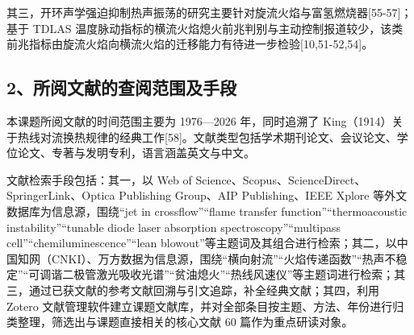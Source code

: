\documentclass[UTF8,a4paper,zihao=-4,fontset=windows]{ctexart}
\begin{document}
其三，开环声学强迫抑制热声振荡的研究主要针对旋流火焰与富氢燃烧器[55-57]；基于 TDLAS 温度脉动指标的横流火焰熄火前兆判别与主动控制报道较少，该类前兆指标由旋流火焰向横流火焰的迁移能力有待进一步检验[10,51-52,54]。

\subsection{2、所阅文献的查阅范围及手段}
本课题所阅文献的时间范围主要为 1976—2026 年，同时追溯了 King（1914）关于热线对流换热规律的经典工作[58]。文献类型包括学术期刊论文、会议论文、学位论文、专著与发明专利，语言涵盖英文与中文。

文献检索手段包括：其一，以 Web of Science、Scopus、ScienceDirect、SpringerLink、Optica Publishing Group、AIP Publishing、IEEE Xplore 等外文数据库为信息源，围绕“jet in crossflow”“flame transfer function”“thermoacoustic instability”“tunable diode laser absorption spectroscopy”“multipass cell”“chemiluminescence”“lean blowout”等主题词及其组合进行检索；其二，以中国知网（CNKI）、万方数据为信息源，围绕“横向射流”“火焰传递函数”“热声不稳定”“可调谐二极管激光吸收光谱”“贫油熄火”“热线风速仪”等主题词进行检索；其三，通过已获文献的参考文献回溯与引文追踪，补全经典文献；其四，利用 Zotero 文献管理软件建立课题文献库，并对全部条目按主题、方法、年份进行归类整理，筛选出与课题直接相关的核心文献 60 篇作为重点研读对象。
\end{document}
